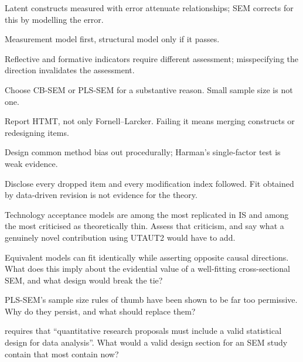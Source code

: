 \begin{chaptersummary}
\begin{tight}
  \item Latent constructs measured with error attenuate relationships; SEM
    corrects for this by modelling the error.
  \item Measurement model first, structural model only if it passes.
  \item Reflective and formative indicators require different assessment;
    misspecifying the direction invalidates the assessment.
  \item Choose CB-SEM or PLS-SEM for a substantive reason. Small sample size is
    not one.
  \item Report HTMT, not only Fornell--Larcker. Failing it means merging
    constructs or redesigning items.
  \item Design common method bias out procedurally; Harman's single-factor test
    is weak evidence.
  \item Disclose every dropped item and every modification index followed. Fit
    obtained by data-driven revision is not evidence for the theory.
\end{tight}
\end{chaptersummary}

\begin{reviewq}
  \item Technology acceptance models are among the most replicated in IS and
    among the most criticised as theoretically thin. Assess that criticism, and
    say what a genuinely novel contribution using UTAUT2 would have to add.
  \item Equivalent models can fit identically while asserting opposite causal
    directions. What does this imply about the evidential value of a
    well-fitting cross-sectional SEM, and what design would break the tie?
  \item PLS-SEM's sample size rules of thumb have been shown to be far too
    permissive. Why do they persist, and what should replace them?
  \item {} requires that ``quantitative research
    proposals must include a valid statistical design for data analysis''. What
    would a valid design section for an SEM study contain that most contain
    now?
\end{reviewq}
